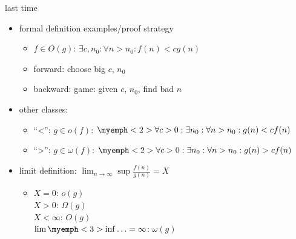 \begin{comment}
    \begin{frame}{last time}
    \begin{itemize}
    \item arrays and multi-dimensional arrays in C++
        \begin{itemize}
        \item row-major order
        \end{itemize}
    \item command line parameters
    \item asymptotic comparisions
        \begin{itemize}
        \item ignore constant factors, only big behavior
        \item compute theoretically, not empirically
        \item make algorithm decisions w/ implementation
        \end{itemize}
    \item classes: $O(f)$: $\le f$; $\Omega(f)$: $\ge f$; $\Theta(f)$: $= f$
    \item formal definition: $\le cf(n)$ for all $n \ge n_0$
    \end{itemize}
\end{frame}
\end{comment}

\begin{frame}{last time}
    \begin{itemize}
    \item formal definition examples/proof strategy
        \begin{itemize}
        \item $f \in O(g)$: $\exists c, n_0: \forall n > n_0: f(n) < cg(n)$
        \item forward: choose big $c$, $n_0$
        \item backward: game: given $c$, $n_0$, find bad $n$
        \end{itemize}
    \item other classes:
        \begin{itemize}
            \item ``<'': $g\in o(f)$: $\myemph<2>{\forall c > 0}: \exists n_0: \forall n > n_0: g(n) < c f(n)$
            \item ``>'': $g\in \omega(f)$: $\myemph<2>{\forall c > 0}: \exists n_0: \forall n > n_0: g(n) > c f(n)$
        \end{itemize}
    \item limit definition: $\lim_{n\to\infty}\sup \frac{f(n)}{g(n)} = X$
        \begin{itemize}
            \item $X = 0$: $o(g)$ \\ $X > 0$: $\Omega(g)$ \\$X < \infty$: $O(g)$ \\$\lim\myemph<3>{\inf}\ldots=\infty$: $\omega(g)$
        \end{itemize}
    \end{itemize}
\end{frame}
